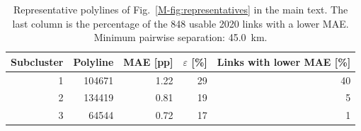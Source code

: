 \begin{table}[htbp]
\centering
\caption{Representative polylines of Fig.~\ref{M-fig:representatives} in the main text. The last column is the percentage of the 848 usable 2020 links with a lower MAE. Minimum pairwise separation: 45.0~km.}
\label{tab:representatives}
\begin{tabular}{@{}rrrrr@{}}
\toprule
Subcluster & Polyline & MAE [pp] & $\varepsilon$ [\%] & Links with lower MAE [\%] \\
\midrule
1 & 104671 & 1.22 & 29 & 40 \\
2 & 134419 & 0.81 & 19 & 5 \\
3 & 64544 & 0.72 & 17 & 1 \\
\bottomrule
\end{tabular}
\end{table}
